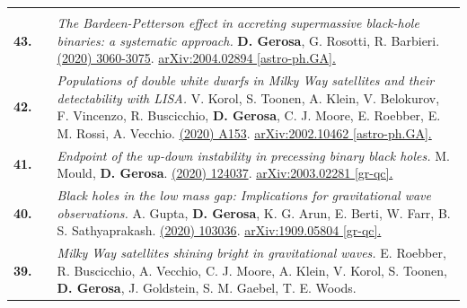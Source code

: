{\begin{longtable}{rp{0.3cm}p{15.8cm}}
\vspace{0.09cm}\\
%
\textbf{43.} & & \textit{The Bardeen-Petterson effect in accreting supermassive black-hole binaries: a systematic approach.}
\newline{}
\textbf{D. Gerosa}, G. Rosotti, R. Barbieri.
\newline{}
\href{https://doi.org/10.1093/mnras/staa1693}{\mnras 496 (2020) 3060-3075}. \href{https://arxiv.org/abs/2004.02894}{arXiv:2004.02894 [astro-ph.GA].}
\vspace{0.09cm}\\
%
\textbf{42.} & & \textit{Populations of double white dwarfs in Milky Way satellites and their detectability with LISA.}
\newline{}
V. Korol, S. Toonen, A. Klein, V. Belokurov, F. Vincenzo, R. Buscicchio, \textbf{D. Gerosa}, C. J. Moore, E. Roebber, E. M. Rossi, A. Vecchio.
\newline{}
\href{https://www.aanda.org/articles/aa/abs/2020/06/aa37764-20/aa37764-20.html}{\aap 638 (2020) A153}. \href{https://arxiv.org/abs/2002.10462}{arXiv:2002.10462 [astro-ph.GA].}
\vspace{0.09cm}\\
%
\textbf{41.} & & \textit{Endpoint of the up-down instability in precessing binary black holes.}
\newline{}
M. Mould, \textbf{D. Gerosa}.
\newline{}
\href{https://journals.aps.org/prd/abstract/10.1103/PhysRevD.101.124037}{\prd 101 (2020) 124037}. \href{https://arxiv.org/abs/2003.02281}{arXiv:2003.02281 [gr-qc].}
\vspace{0.09cm}\\
%
\textbf{40.} & & \textit{Black holes in the low mass gap: Implications for gravitational wave observations.}
\newline{}
A. Gupta, \textbf{D. Gerosa}, K. G. Arun, E. Berti, W. Farr, B. S. Sathyaprakash.
\newline{}
\href{https://journals.aps.org/prd/abstract/10.1103/PhysRevD.101.103036}{\prd 101 (2020) 103036}. \href{https://arxiv.org/abs/1909.05804}{arXiv:1909.05804 [gr-qc].}
\vspace{0.09cm}\\
%
\textbf{39.} & & \textit{Milky Way satellites shining bright in gravitational waves.}
\newline{}
E. Roebber, R. Buscicchio, A. Vecchio, C. J. Moore, A. Klein, V. Korol, S. Toonen, \textbf{D. Gerosa}, J. Goldstein, S. M. Gaebel, T. E. Woods.
\newline{}

\end{longtable}}
